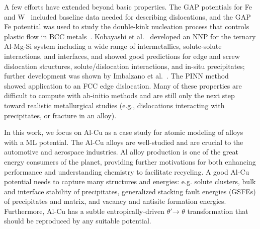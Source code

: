 \documentclass{article}
\begin{document}
A few efforts have extended beyond basic properties.  The GAP potentials for Fe~\cite{Dragoni2018AchievingIron} and W~\cite{Szlachta2014AccuracyTungsten} included baseline data needed for describing dislocations, and the GAP Fe potential was used to study the double-kink nucleation process that controls plastic flow in BCC metals~\cite{Maresca2018}.
Kobayashi et al.~\cite{Kobayashi2017} developed an NNP for the ternary Al-Mg-Si system including a wide range of intermetallics, solute-solute interactions, and interfaces, and showed good predictions for edge and screw dislocation structures, solute/dislocation interactions, and in-situ precipitates; further development was shown by Imbalzano et al.~\cite{Imbalzano2018}.
The PINN method ~\cite{PurjaPun0PhysicallyMaterials} showed application to an FCC edge dislocation.
Many of these properties are difficult to compute with ab-initio methods and are still only the next step toward realistic metallurgical studies (e.g., dislocations interacting with precipitates, or fracture in an alloy).



In this work, we focus on Al-Cu as a case study for atomic modeling of alloys with a ML potential. The Al-Cu alloys are well-studied \cite{Preston1938StructureAlloys} and are crucial to the automotive and aerospace industries\cite{Nie2014PhysicalAlloys}.  Al alloy production is one of the great energy consumers of the planet\cite{Raabe2019StrategiesMetals}, providing further motivations for both enhancing performance and understanding chemistry to facilitate recycling.  A good Al-Cu potential needs to capture many structures and energies: e.g. solute clusters, bulk and interface stability of precipitates, generalized stacking fault energies (GSFEs) of precipitates and matrix, and vacancy and antisite formation energies. Furthermore, Al-Cu has a subtle entropically-driven $\theta'$→ $\theta$ transformation \cite{Wolverton2001b} that should be reproduced by any suitable potential.
\end{document}
